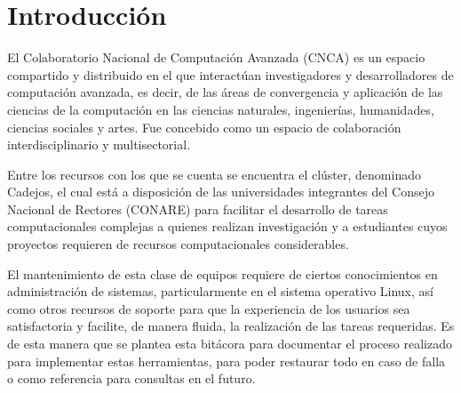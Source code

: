 \chapter{Introducción}
El Colaboratorio Nacional de Computación Avanzada (CNCA) es un espacio compartido y distribuido en el que interactúan investigadores y desarrolladores de computación avanzada, es decir, de las áreas de convergencia y aplicación de las ciencias de la computación en las ciencias naturales, ingenierías, humanidades, ciencias sociales y artes. Fue concebido como un espacio de colaboración interdisciplinario y multisectorial. 

Entre los recursos con los que se cuenta se encuentra el clúster, denominado Cadejos, el cual está a disposición de las universidades integrantes del Consejo Nacional de Rectores (CONARE) para facilitar el desarrollo de tareas computacionales complejas a quienes realizan investigación y a estudiantes cuyos proyectos requieren de recursos computacionales considerables.

El mantenimiento de esta clase de equipos requiere de ciertos conocimientos en administración de sistemas, particularmente en el sistema operativo Linux, así como otros recursos de soporte para que la experiencia de los usuarios sea satisfactoria y facilite, de manera fluida,  la realización de las tareas requeridas. Es de esta manera que se plantea esta bitácora para documentar el proceso realizado para implementar estas herramientas, para poder restaurar todo en caso de falla o como referencia para consultas en el futuro.

\clearpage